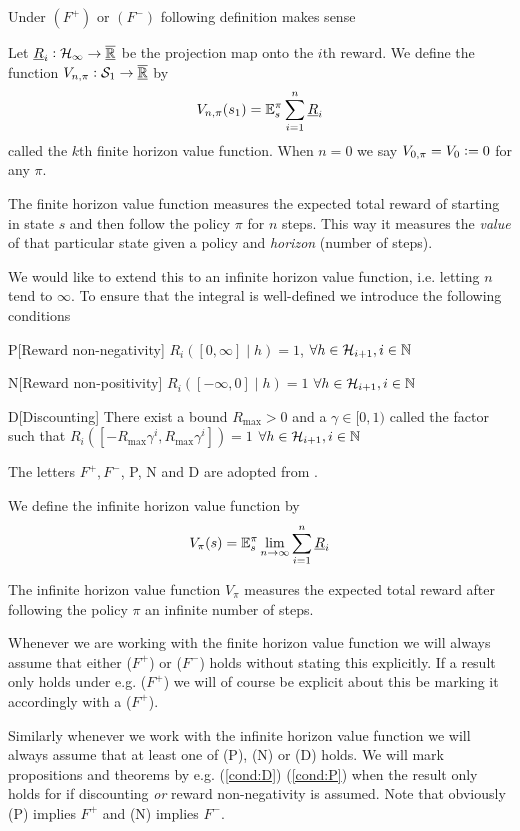 Under $(F^+)$ or $(F^-)$ following definition makes sense 
\begin{defn}
  Let $\underline{R}_i : \mathcal{H}_\infty \to \overline{\underline{\mathbb{R}}}$ be the projection map onto the
  $i$th reward. We define the function $V_{n, \pi} : \mathcal{S}_1 \to \overline{\underline{\mathbb{R}}}$ by
  \[ V_{n,\pi}(s_1) = \mathbb{E}_s^\pi \sum_{i=1}^n \underline{R}_i \]
  called the $k$th finite horizon value function.
  When $n=0$ we say $V_{0,\pi} = V_0 \vcentcolon= 0$ for any $\pi$.
\end{defn}
The finite horizon value function
measures the expected total reward of starting in state $s$
and then follow the policy $\pi$ for $n$ steps.
This way it measures the \emph{value} of that particular state
given a policy and \emph{horizon} (number of steps).

We would like to extend this to an infinite horizon value function,
i.e. letting $n$ tend to $\infty$. To ensure that the integral is well-defined
we introduce the following conditions
\begin{cond}{P}[Reward non-negativity] $R_i([0,\infty] \mid h) = 1$,
  $\forall h \in \mathcal{H}_{i+1}, i \in \mathbb{N}$
  \label{cond:P}
\end{cond}
\begin{cond}{N}[Reward non-positivity] $R_i([-\infty, 0] \mid h) = 1$
  $\forall h \in \mathcal{H}_{i+1}, i \in \mathbb{N}$
  \label{cond:N} 
\end{cond}
\begin{cond}{D}[Discounting] There exist a bound $R_{\max} > 0$ and a
  $\gamma \in [0,1)$ called the  factor such that
  $R_i([-R_{\max} \gamma^i, R_{\max} \gamma^i]) = 1$
  $\forall h \in \mathcal{H}_{i+1}, i \in \mathbb{N}$
  \label{cond:D}
\end{cond}
\begin{rem}
  The letters $F^+, F^-$, P, N and D are adopted from . 
\end{rem}
\begin{defn}
  We define the infinite horizon value function by
  \[ V_\pi(s) = \mathbb{E}_s^\pi \lim_{n \to \infty} \sum_{i=1}^n \underline{R}_i \]
\end{defn}
The infinite horizon value function $V_\pi$ measures the expected total
reward after following the policy $\pi$ an infinite number of steps.

\begin{rem}
  Whenever we are working with the finite horizon value function
  we will always assume that either ($F^+$) or ($F^-$) holds without
  stating this explicitly.
  If a result only holds under e.g. ($F^+$) we will of course be explicit
  about this be marking it accordingly with a ($F^+$).

  Similarly whenever we work with the infinite horizon value function we will
  always assume that at least one of (P), (N) or (D) holds.
  We will mark propositions and theorems
  by e.g. (\cref{cond:D}) (\cref{cond:P}) when
  the result only holds for if discounting \emph{or} reward non-negativity
  is assumed.
  Note that obviously (P) implies $F^+$ and (N) implies $F^-$.
\end{rem}

